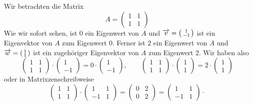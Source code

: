 \begin{beispiel} Wir betrachten die Matrix 
  	$$ A = \left( \begin{matrix} 1 & 1 \\ 1 & 1 \end{matrix} \right) $$
Wie wir sofort sehen, ist $0$ ein Eigenwert 
von $A$ und $\overrightarrow{v} = \left( \begin{smallmatrix} 1 \\ -1 \end{smallmatrix} 
\right)$ ist ein Eigenvektor von $A$ zum Eigenwert $0$. Ferner ist
$2$ ein Eigenwert von $A$ und $\overrightarrow{w} = \left( 
\begin{smallmatrix} 1 \\ 1 \end{smallmatrix} \right)$ ist ein zugehöriger Eigenvektor von $A$  
zum Eigenwert $2$. Wir haben also 
  	$$ \left( \begin{matrix} 1 & 1 \\ 1 & 1 \end{matrix} \right) \cdot
     	\left( \begin{matrix} 1 \\ -1 \end{matrix} \right) = 0 \cdot
    	\left( \begin{matrix} 1 \\ -1 \end{matrix} \right), \qquad 
  	\left( \begin{matrix} 1 & 1 \\ 1 & 1 \end{matrix} \right) \cdot 
  	\left( \begin{matrix} 1 \\ 1 \end{matrix} \right) = 2 \cdot 
  	\left( \begin{matrix} 1 \\ 1 \end{matrix} \right) $$
oder in Matrixzenschreibweise
  	$$ \left( \begin{matrix} 1 & 1 \\ 1 & 1 \end{matrix} \right) \cdot
    	\left( \begin{matrix} 1 & 1 \\ -1 & 1 \end{matrix} \right) = 
   	\left( \begin{matrix} 0 & 2 \\ 0 & 2 \end{matrix} \right) = 
   	\left( \begin{matrix} 1 & 1 \\ -1 & 1 \end{matrix} \right) \cdot 
$$
\end{beispiel}
